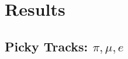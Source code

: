 \section{Results}\label{sec:Results}




\subsection{Picky Tracks: $\pi, \mu, e$}\label{sec:PickyTrkPiMuE}
